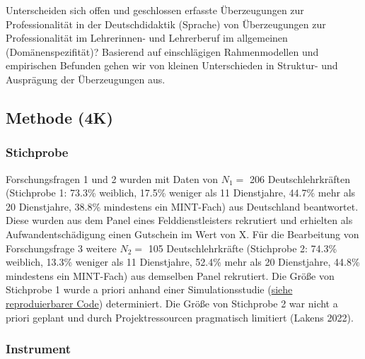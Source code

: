 \documentclass[
  letterpaper,
  DIV=11]{scrartcl}
\begin{document}
Unterscheiden sich offen und geschlossen erfasste Überzeugungen zur
Professionalität in der Deutschdidaktik (Sprache) von Überzeugungen zur
Professionalität im Lehrerinnen- und Lehrerberuf im allgemeinen
(Domänenspezifität)? Basierend auf einschlägigen Rahmenmodellen und
empirischen Befunden gehen wir von kleinen Unterschieden in Struktur-
und Ausprägung der Überzeugungen aus.

\subsection{Methode (4K)}\label{methode-4k}

\subsubsection{Stichprobe}\label{stichprobe}

Forschungsfragen 1 und 2 wurden mit Daten von \(N_1 =\) 206
Deutschlehrkräften (Stichprobe 1: 73.3\% weiblich, 17.5\% weniger als 11
Dienstjahre, 44.7\% mehr als 20 Dienstjahre, 38.8\% mindestens ein
MINT-Fach) aus Deutschland beantwortet. Diese wurden aus dem Panel eines
Felddienstleisters rekrutiert und erhielten als Aufwandentschädigung
einen Gutschein im Wert von X. Für die Bearbeitung von Forschungsfrage 3
weitere \(N_2 =\) 105 Deutschlehrkräfte (Stichprobe 2: 74.3\% weiblich,
13.3\% weniger als 11 Dienstjahre, 52.4\% mehr als 20 Dienstjahre,
44.8\% mindestens ein MINT-Fach) aus demselben Panel rekrutiert. Die
Größe von Stichprobe 1 wurde a priori anhand einer Simulationsstudie
(\href{Externer\%20LINK}{siehe reproduierbarer Code}) determiniert. Die
Größe von Stichprobe 2 war nicht a priori geplant und durch
Projektressourcen pragmatisch limitiert (Lakens 2022).

\subsubsection{Instrument}\label{instrument}
\end{document}
